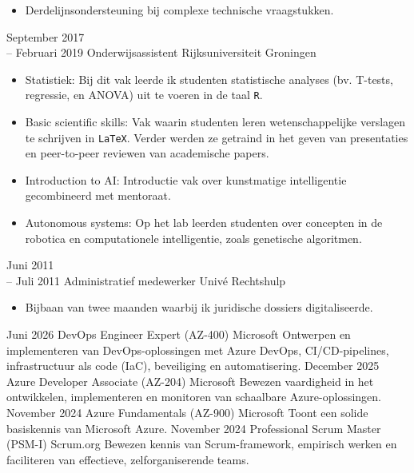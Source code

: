 \documentclass[9pt]{developercv} %
\begin{document}
\begin{entrylist}
{\begin{itemize}[noitemsep,topsep=0pt,parsep=0pt,partopsep=0pt, leftmargin=-1pt]
            \item Derdelijnsondersteuning bij complexe technische vraagstukken.
        \end{itemize}}
	\entry
		{September 2017 \\ -- Februari 2019}
		{Onderwijsassistent}
		{Rijksuniversiteit Groningen}
		{\vspace{-10pt}
        \begin{itemize}[noitemsep,topsep=0pt,parsep=0pt,partopsep=0pt, leftmargin=-1pt]
            \item Statistiek: Bij dit vak leerde ik studenten statistische analyses (bv. T-tests, regressie, en ANOVA) uit te voeren in de taal \texttt{R}.
            \item Basic scientific skills: Vak waarin studenten leren wetenschappelijke verslagen te schrijven in \texttt{LaTeX}. Verder werden ze getraind in het geven van presentaties en peer-to-peer reviewen van academische papers.
            \item Introduction to AI: Introductie vak over kunstmatige intelligentie gecombineerd met mentoraat.
            \item Autonomous systems: Op het lab leerden studenten over concepten in de robotica en computationele intelligentie, zoals genetische algoritmen.
        \end{itemize}}
    \entry
        {Juni 2011 \\ -- Juli 2011}
		{Administratief medewerker}
		{Univé Rechtshulp}
		{\vspace{-10pt}
        \begin{itemize}[noitemsep,topsep=0pt,parsep=0pt,partopsep=0pt, leftmargin=-1pt]
            \item Bijbaan van twee maanden waarbij ik juridische dossiers digitaliseerde.
        \end{itemize}}
\end{entrylist}

\begin{entrylist}
    \entry
        {Juni 2026}
        {DevOps Engineer Expert (AZ-400)}
        {Microsoft}
        {Ontwerpen en implementeren van DevOps-oplossingen met Azure DevOps, CI/CD-pipelines, infrastructuur als code (IaC), beveiliging en automatisering.
        }
    \entry
        {December 2025}
        {Azure Developer Associate (AZ-204)}
        {Microsoft}
        {Bewezen vaardigheid in het ontwikkelen, implementeren en monitoren van schaalbare Azure-oplossingen.
        }
    \entry
		{November 2024}
		{Azure Fundamentals (AZ-900)}
		{Microsoft}
		{Toont een solide basiskennis van Microsoft Azure.}
    \entry
		{November 2024}
		{Professional Scrum Master (PSM-I)}
		{Scrum.org}
		{Bewezen kennis van Scrum-framework, empirisch werken en faciliteren van effectieve, zelforganiserende teams.}
\end{entrylist}
\end{document}
